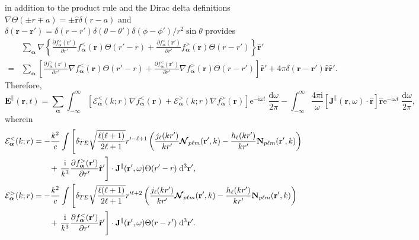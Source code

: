 \documentclass{article}
\begin{document}
in addition to the product rule and the Dirac delta definitions $\nabla\Theta(\pm r \mp a) = \pm\hat{\mathbf{r}}\delta(r - a)$ and $\delta(\mathbf{r} - \mathbf{r}') = \delta(r - r')\delta(\theta - \theta')\delta(\phi - \phi')/r^2\sin\theta$ provides
\begin{equation}
\begin{split}
&\sum_{\bm{\alpha}}\nabla\left\{\frac{\partial f_{\bm{\alpha}}^>(\mathbf{r}')}{\partial r'}f_{\bm{\alpha}}^<(\mathbf{r})\Theta(r' - r) + \frac{\partial f_{\bm{\alpha}}^<(\mathbf{r}')}{\partial r'}f_{\bm{\alpha}}^>(\mathbf{r})\Theta(r - r')\right\}\hat{\mathbf{r}}'\\
=&\sum_{\bm{\alpha}}\left[\frac{\partial f_{\bm{\alpha}}^>(\mathbf{r}')}{\partial r'}\nabla f_{\bm{\alpha}}^<(\mathbf{r})\Theta(r' - r) + \frac{\partial f_{\bm{\alpha}}^<(\mathbf{r}')}{\partial r'} \nabla f_{\bm{\alpha}}^>(\mathbf{r})\Theta(r - r')\right]\hat{\mathbf{r}}' + 4\pi\delta(\mathbf{r} - \mathbf{r}')\hat{\mathbf{r}}\hat{\mathbf{r}}'.
\end{split}
\end{equation}
Therefore,
\begin{equation}\label{eq:Elongitudinal2}
\mathbf{E}^\parallel(\mathbf{r},t) = \sum_{\bm{\alpha}}\int_{-\infty}^\infty\left[\mathcal{E}_{\bm{\alpha}}^<(k;r)\nabla f_{\bm{\alpha}}^<(\mathbf{r}) + \mathcal{E}_{\bm{\alpha}}^>(k;r)\nabla f_{\bm{\alpha}}^>(\mathbf{r})\right]\mathrm{e}^{-\mathrm{i}\omega t}\;\frac{\mathrm{d}\omega}{2\pi} - \int_{-\infty}^\infty\frac{4\pi\mathrm{i}}{\omega}\left[\mathbf{J}^\parallel(\mathbf{r},\omega)\cdot\hat{\mathbf{r}}\right]\hat{\mathbf{r}}\mathrm{e}^{-\mathrm{i}\omega t}\;\frac{\mathrm{d}\omega}{2\pi},
\end{equation}
wherein
\begin{equation}
\begin{split}
\mathcal{E}_{\bm{\alpha}}^<(k;r) &= -\frac{k^2}{c}\int\left[\delta_{TE}\sqrt{\frac{\ell(\ell + 1)}{2\ell + 1}}r'^{-\ell + 1}\left(\frac{j_\ell(kr')}{kr'}\bm{\mathcal{N}}_{p\ell m}(\mathbf{r}',k) - \frac{h_\ell(kr')}{kr'}\mathbf{N}_{p\ell m}(\mathbf{r}',k)\right)\right.\\
&\qquad+\left.\frac{\mathrm{i}}{k^3}\frac{\partial f_{\bm{\alpha}}^>(\mathbf{r}')}{\partial r'}\hat{\mathbf{r}}' 
\vphantom{\sqrt{\frac{\ell}{\ell}}} \right]\cdot\mathbf{J}^\parallel(\mathbf{r}',\omega)\Theta(r' - r)\;\mathrm{d}^3\mathbf{r}',\\
\mathcal{E}_{\bm{\alpha}}^>(k;r) &= -\frac{k^2}{c}\int\left[\delta_{TE}\sqrt{\frac{\ell(\ell + 1)}{2\ell + 1}}r'^{\ell + 2}\left(\frac{j_\ell(kr')}{kr'}\bm{\mathcal{N}}_{p\ell m}(\mathbf{r}',k) - \frac{h_\ell(kr')}{kr'}\mathbf{N}_{p\ell m}(\mathbf{r}',k)\right)\right.\\
&\qquad+\left.\frac{\mathrm{i}}{k^3}\frac{\partial f_{\bm{\alpha}}^<(\mathbf{r}')}{\partial r'}\hat{\mathbf{r}}' 
\vphantom{\sqrt{\frac{\ell}{\ell}}} \right]\cdot\mathbf{J}^\parallel(\mathbf{r}',\omega)\Theta(r - r')\;\mathrm{d}^3\mathbf{r}'.
\end{split}
\end{equation}
\end{document}
